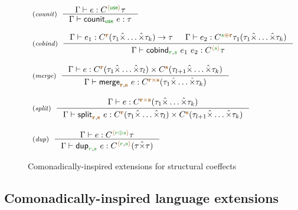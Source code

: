 \begin{figure}[t]
\begin{equation*}
\begin{array}{l}
\tyrule{counit}
  {\Gamma \vdash e : \ctyp{\alift{\cunit}}{\tau}}
  {\Gamma \vdash \ident{counit}_{\cunit}~e : \tau} \\
\\
\tyrule{cobind}
  {\Gamma \vdash e_1 : \ctyp{\aclrd{\textbf{r}}}{(\tau_1 \xtimes \ldots \xtimes \tau_k)} \rightarrow \tau & \Gamma \vdash e_2 : \ctyp{\cclrd{s}\aseq\aclrd{\textbf{r}}}{\tau_1(\tau_1 \xtimes \ldots \xtimes \tau_k)} }
  {\Gamma \vdash \ident{cobind}_{\cclrd{r}, \cclrd{s}}~e_1~e_2 : \ctyp{\alift{\cclrd{s}}}{\tau}} \\
  \\
\tyrule{merge}
  {\Gamma \vdash  e : \ctyp{\aclrd{\textbf{r}}}{(\tau_1 \xtimes \ldots \xtimes \tau_l)} \times \ctyp{\aclrd{\textbf{s}}}{(\tau_{l+1} \xtimes \ldots \xtimes \tau_k)} }
  {\Gamma \vdash  \ident{merge}_{\aclrd{\textbf{r}},\aclrd{\textbf{s}}}~e : \ctyp{\aclrd{\textbf{r}}\atimes\aclrd{\textbf{s}}}{(\tau_1 \xtimes \ldots \xtimes \tau_k)} }\\
\\
\tyrule{split}
  {\Gamma \vdash  e : \ctyp{\aclrd{\textbf{r}}\atimes\aclrd{\textbf{s}}}{(\tau_1 \xtimes \ldots \xtimes \tau_k)} }
  {\Gamma \vdash  \ident{split}_{\aclrd{\textbf{r}},\aclrd{\textbf{s}}}~e : \ctyp{\aclrd{\textbf{r}}}{(\tau_1 \xtimes \ldots \xtimes \tau_l)} \times \ctyp{\aclrd{\textbf{s}}}{(\tau_{l+1} \xtimes \ldots \xtimes \tau_k)}} \\
\\
\tyrule{dup}
  {\Gamma \vdash  e : \ctyp{\alift{\cclrd{r}\cpar\cclrd{s}}}{\tau} }
  {\Gamma \vdash  \ident{dup}_{\cclrd{r},\cclrd{s}}~e : \ctyp{\alift{\cclrd{r},\cclrd{s}}}{(\tau \xtimes \tau)} } \\
\end{array}
\end{equation*}

\caption{Comonadically-inspired extensions for structural coeffects}
\label{fig:struct-semantics-ext}
\end{figure}


\subsection{Comonadically-inspired language extensions}
\label{sec:struct-transl-ext}

